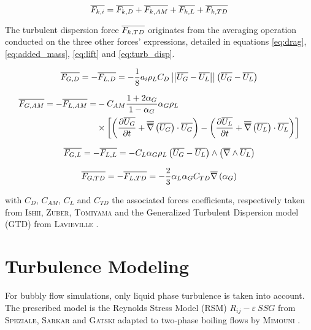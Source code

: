 \begin{equation}
\label{eq:force_balance}
\overline{F_{k,i}}=\overline{F_{k,D}} + \overline{F_{k,AM}} +\overline{F_{k,L}} +\overline{F_{k,TD}}
\end{equation}

The turbulent dispersion force $\overline{F_{k,TD}}$ originates from the averaging operation conducted on the three other forces' expressions, detailed in equations \ref{eq:drag}, \ref{eq:added_mass}, \ref{eq:lift} and \ref{eq:turb_disp}.


\begin{equation}
\label{eq:drag}
\overline{F_{G,D}}=-\overline{F_{L,D}}=-\frac{1}{8}a_{i}\rho_{L}C_{D}\left|\left|{ \overline{U_{G}}-\overline{U_{L}} }\right|\right|\left( \overline{U_{G}}-\overline{U_{L}}  \right)
\end{equation}

\begin{equation}
\label{eq:added_mass}
\begin{aligned}
\overline{F_{G,AM}}=-\overline{F_{L,AM}}=&-C_{AM} \frac{1+2\alpha_{G}}{1-\alpha_{G}}\alpha_{G}\rho_{L}\\
&\times \left[  \left( \frac{\partial{\overline{U_{G}}}}{\partial t}+\overline{\overline{\nabla}}\left({\overline{U_{G}}}\right)\cdot \overline{U_{G}}  \right) - \left( \frac{\partial{\overline{U_{L}}}}{\partial t}+\overline{\overline{\nabla}}\left({\overline{U_{L}}}\right)\cdot \overline{U_{L}}  \right)  \right]
\end{aligned}
\end{equation}

\begin{equation}
\label{eq:lift}
\overline{F_{G,L}}=-\overline{F_{L,L}}=-C_{L}\alpha_{G}\rho_{L}\left( \overline{U_{G}}-\overline{U_{L}}  \right)\wedge \left( \overline{\nabla}\wedge{\overline{U_{L}}}  \right)
\end{equation}

\begin{equation}
\label{eq:turb_disp}
\overline{F_{G,TD}}=-\overline{F_{L,TD}}=-\frac{2}{3}\alpha_{L}\alpha_{G}C_{TD}\overline{\nabla}\left({\alpha_{G}}\right)
\end{equation}

with $C_{D}$, $C_{AM}$, $C_{L}$ and $C_{TD}$ the associated forces coefficients, respectively taken from \textsc{Ishii}\cite{Ishii1967}, \textsc{Zuber}\cite{Zuber1964}, \textsc{Tomiyama}\cite{Tomiyama2002} and the Generalized Turbulent Dispersion model (GTD) from \textsc{Lavieville} \etal \cite{Lavieville2017}.

\section{Turbulence Modeling}
\label{subsec:turbulence}

For bubbly flow simulations, only liquid phase turbulence is taken into account. The prescribed model is the Reynolds Stress Model (RSM) $R_{ij}-\varepsilon~SSG$ from \textsc{Speziale}, \textsc{Sarkar} and \textsc{Gatski}\cite{Speziale1991} adapted to two-phase boiling flows by \textsc{Mimouni} \etal\cite{Mimouni2011}.

